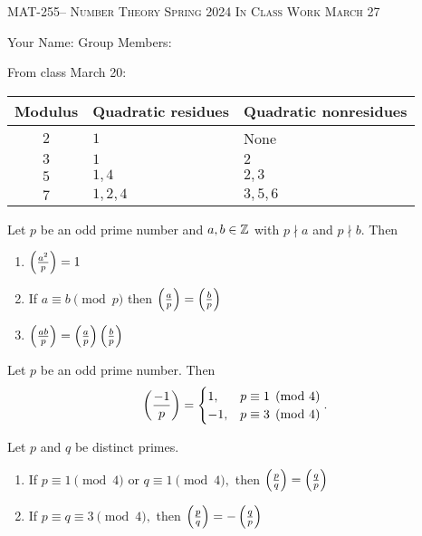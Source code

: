 \documentclass[handout]{ximera}
\date{March 27, 2024}
\begin{document}
\handoutAbstract
\maketitle
 	\begin{center}%
    	{\large \scshape MAT-255-- Number Theory 
			\hfill Spring 2024 
			\hfill In Class Work March 27}%
    
		{\large Your Name: \hrulefill \quad 
			Group Members:\hrulefill \quad 
			\hrulefill
			\par}%
 	\end{center}%
	 
From class March 20:

\begin{tabular}{cll}
	Modulus & Quadratic residues & Quadratic nonresidues\\\hline
	$2$	& $1$ 	& None\\
	$3$	& $1$	& $2$\\
	$5$	& $1,4$	& $2,3$\\
	$7$	& $1,2,4$	& $3,5,6$
\end{tabular}

\begin{prop*}[Proposition 4.5]
	Let $p$ be an odd prime number and $a,b\in\mathbb Z$ with $p\nmid a$ and $p\nmid b.$ Then 
	\begin{enumerate}[label=(\alph*)]
		\item $\left(\frac{a^2}{p}\right)=1$ \label{squares-are-square}
		\item If $a\equiv b\pmod{p}$ then $\left(\frac{a}{p}\right)=\left(\frac{b}{p}\right)$ \label{legendre-respects-mod}
		\item $\left(\frac{ab}{p}\right)=\left(\frac{a}{p}\right)\left(\frac{b}{p}\right)$ \label{legendre-mult}
	\end{enumerate}
\end{prop*}

\begin{thm*}[Theorem 4.6]\label{thm:residue-neg1}
	Let $p$ be an odd prime number. Then 
	\[
		\left(\frac{-1}{p}\right)=
			\begin{cases}
 				1, & p\equiv 1\pmod{4}\\
				-1, & p\equiv 3\pmod{4}
			\end{cases}.
	\]
\end{thm*}

\begin{thm*}\label{quad-rec}
	Let $p$ and $q$ be distinct primes.  
	\begin{enumerate}[label=(\alph*)]
		\item If $p\equiv 1 \pmod{4}$ or $q\equiv 1\pmod{4},$ then $\left(\frac{p}{q}\right)=\left(\frac{q}{p}\right)$
 		\item If $p\equiv q \equiv 3 \pmod{4},$ then $\left(\frac{p}{q}\right)=-\left(\frac{q}{p}\right)$
	\end{enumerate}
\end{thm*}
\end{document}
